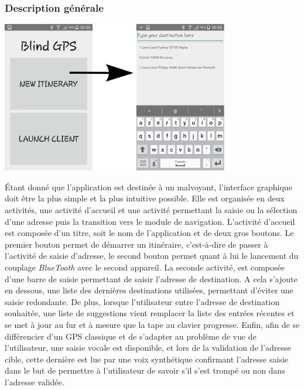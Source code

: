 \subsubsection{Description générale}
\begin{center}
\includegraphics[height=250px]{Assets/screenUI.png}
\label{screenUI}
\end{center}
Étant donné que l'application est destinée à un malvoyant, l'interface graphique doit être la plus simple et la plus intuitive possible. Elle est organisée en deux activités, une activité d'accueil et une activité permettant la saisie ou la sélection d'une adresse puis la transition vers le module de navigation. L'activité d'accueil est composée d'un titre, soit le nom de l'application et de deux gros boutons. Le premier bouton permet de démarrer un itinéraire, c'est-à-dire de passer à l'activité de saisie d'adresse, le second bouton permet quant à lui le lancement du couplage \textit{BlueTooth} avec le second appareil. La seconde activité, est composée d'une barre de saisie permettant de saisir l'adresse de destination. A cela s'ajoute en dessous, une liste des dernières destinations utilisées, permettant d'éviter une saisie redondante. De plus, lorsque l'utilisateur entre l'adresse de destination souhaitée, une liste de suggestions vient remplacer la liste des entrées récentes et se met à jour au fur et à mesure que la tape au clavier progresse. Enfin, afin de se différencier d'un GPS classique et de s'adapter au problème de vue de l'utilisateur, une saisie vocale est disponible, et lors de la validation de l'adresse cible, cette dernière est lue par une voix synthétique confirmant l'adresse saisie dans le but de permettre à l'utilisateur de savoir s'il s'est trompé ou non dans l'adresse validée.

